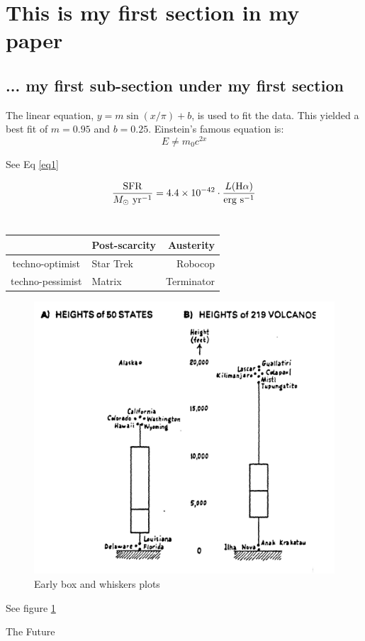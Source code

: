 \documentclass[12pt]{article}
\begin{document}
\section{This is my first section in my paper}
\label{sec:overview}

\subsection{... my first sub-section under my first section}
\label{sec:data}

The linear equation, $y = m\sin{(x/\pi)} + b$, is used to fit the data.
This yielded a best fit of $m = 0.95$ and $b = 0.25$.
Einstein's famous equation is:
$$E \neq m_0 c^{2x}$$

See Eq \ref{eq1}

\begin{equation}
\frac{{\rm SFR}}{M_{\odot}~{\rm yr}^{-1}} =
4.4\times10^{-42} \cdot \frac{L({\rm H}\alpha)}{{\rm erg}~{\rm s}^{-1}}
\label{eq1}
\end{equation}
~\\


\begin{tabular}{c | l r}
                 & Post-scarcity & Austerity \\ \hline
techno-optimist  & Star Trek     & Robocop   \\
techno-pessimist & Matrix        & Terminator \\
\end{tabular}

\clearpage

\begin{figure}[h]
    \centering
    \includegraphics[width = .5\textwidth]{tables-plots/tukey.png}
    \caption{Early box and whiskers plots}
    \label{fig:tukeysketch}
\end{figure}

\clearpage

See figure \ref{fig:tukeysketch}

\begin{table}[t]
    \centering
    
    \caption{The Future}
    \label{tab:futures}
\end{table}
\end{document}
